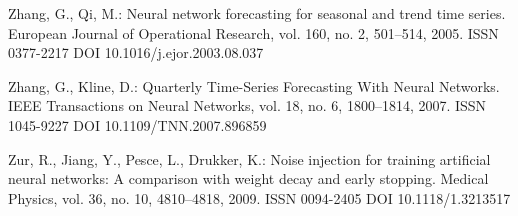 \begin{thebibliography}{99.}
 Zhang, G., Qi, M.: Neural network forecasting for seasonal and trend time series. European Journal of Operational Research, vol. 160, no. 2, 501--514, 2005. ISSN 0377-2217 DOI 10.1016/j.ejor.2003.08.037

 Zhang, G., Kline, D.: Quarterly Time-Series Forecasting With Neural Networks. IEEE Transactions on Neural Networks, vol. 18, no. 6, 1800--1814, 2007. ISSN 1045-9227 DOI 10.1109/TNN.2007.896859

 Zur, R., Jiang, Y., Pesce, L., Drukker, K.: Noise injection for training artificial neural networks: A comparison with weight decay and early stopping. Medical Physics, vol. 36, no. 10, 4810--4818, 2009. ISSN 0094-2405 DOI 10.1118/1.3213517

\end{thebibliography}
